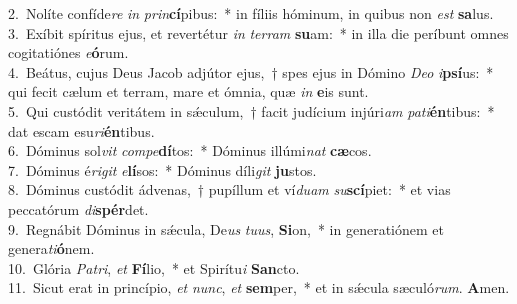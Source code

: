 {2.~}Nolíte confíde\textit{re} \textit{in} \textit{prin}\textbf{cí}pibus:~* in fíliis hóminum, in quibus non \textit{est} \textbf{sa}lus.\\
{3.~}Exíbit spíritus ejus, et revertétur \textit{in} \textit{ter}\textit{ram} \textbf{su}am:~* in illa die períbunt omnes cogitatiónes \textit{e}\textbf{ó}rum.\\
{4.~}Beátus, cujus Deus Jacob adjútor ejus,~† spes ejus in Dómino \textit{De}\textit{o} \textit{i}\textbf{psí}us:~* qui fecit cælum et terram, mare et ómnia, quæ \textit{in} \textbf{e}is sunt.\\
{5.~}Qui custódit veritátem in sǽculum,~† facit judícium injúri\textit{am} \textit{pa}\textit{ti}\textbf{én}tibus:~* dat escam esu\textit{ri}\textbf{én}tibus.\\
{6.~}Dóminus sol\textit{vit} \textit{com}\textit{pe}\textbf{dí}tos:~* Dóminus illúmi\textit{nat} \textbf{cæ}cos.\\
{7.~}Dóminus é\textit{ri}\textit{git} \textit{e}\textbf{lí}sos:~* Dóminus díli\textit{git} \textbf{ju}stos.\\
{8.~}Dóminus custódit ádvenas,~† pupíllum et ví\textit{du}\textit{am} \textit{su}\textbf{scí}piet:~* et vias peccatórum \textit{di}\textbf{spér}det.\\
{9.~}Regnábit Dóminus in sǽcula, De\textit{us} \textit{tu}\textit{us}, \textbf{Si}on,~* in generatiónem et genera\textit{ti}\textbf{ó}nem.\\
{10.~}Glória \textit{Pa}\textit{tri}, \textit{et} \textbf{Fí}lio,~* et Spirítu\textit{i} \textbf{San}cto.\\
{11.~}Sicut erat in princípio, \textit{et} \textit{nunc}, \textit{et} \textbf{sem}per,~* et in sǽcula sæculó\textit{rum}. \textbf{A}men.\\
